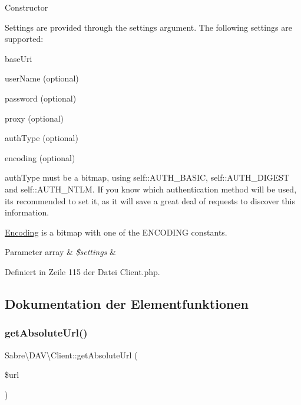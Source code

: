 Constructor

Settings are provided through the \textquotesingle{}settings\textquotesingle{} argument. The following settings are supported\+:


\begin{DoxyItemize}
\item base\+Uri
\item user\+Name (optional)
\item password (optional)
\item proxy (optional)
\item auth\+Type (optional)
\item encoding (optional)
\end{DoxyItemize}

auth\+Type must be a bitmap, using self\+::\+A\+U\+T\+H\+\_\+\+B\+A\+S\+IC, self\+::\+A\+U\+T\+H\+\_\+\+D\+I\+G\+E\+ST and self\+::\+A\+U\+T\+H\+\_\+\+N\+T\+LM. If you know which authentication method will be used, it\textquotesingle{}s recommended to set it, as it will save a great deal of requests to \textquotesingle{}discover\textquotesingle{} this information.

\mbox{\hyperlink{class_encoding}{Encoding}} is a bitmap with one of the E\+N\+C\+O\+D\+I\+NG constants.


\begin{DoxyParams}[1]{Parameter}
array & {\em \$settings} & \\
\hline
\end{DoxyParams}


Definiert in Zeile 115 der Datei Client.\+php.



\subsection{Dokumentation der Elementfunktionen}
\mbox{\label{class_sabre_1_1_d_a_v_1_1_client_a4bc2a41e4e3b071abe849782e8d3c1f5}} 
\subsubsection{\texorpdfstring{get\+Absolute\+Url()}{getAbsoluteUrl()}}
{\footnotesize\ttfamily Sabre\textbackslash{}\+D\+A\+V\textbackslash{}\+Client\+::get\+Absolute\+Url (\begin{DoxyParamCaption}\item[{}]{\$url }\end{DoxyParamCaption})}

